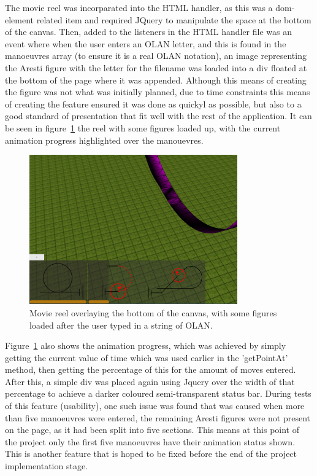 The movie reel was incorparated into the HTML handler, as this was a dom-element related item and required JQuery to manipulate the space at the bottom of the canvas. Then, added to the listeners in the HTML handler file was an event where when the user enters an OLAN letter, and this is found in the manoeuvres array (to ensure it is a real OLAN notation), an image representing the Aresti figure with the letter for the filename was loaded into a div floated at the bottom of the page where it was appended. Although this means of creating the figure was not what was initially planned, due to time constraints this means of creating the feature ensured it was done as quickyl as possible, but also to a good standard of presentation that fit well with the rest of the application. It can be seen in figure~\ref{fig:movie} the reel with some figures loaded up, with the current animation progress highlighted over the manouevres.

\clearpage 

\begin{figure}[h]
  \centering
      \includegraphics[width=0.8\textwidth]{images/movie.png}
  \caption{Movie reel overlaying the bottom of the canvas, with some figures loaded after the user typed in a string of OLAN.}
  \label{fig:movie}
\end{figure}

Figure~\ref{fig:movie} also shows the animation progress, which was achieved by simply getting the current value of time which was used earlier in the 'getPointAt' method, then getting the percentage of this for the amount of moves entered. After this, a simple div was placed again using Jquery over the width of that percentage to achieve a darker coloured semi-transparent status bar. During tests of this feature (usability), one such issue was found that was caused when more than five manoeuvres were entered, the remaining Aresti figures were not present on the page, as it had been split into five sections. This means at this point of the project only the first five manoeuvres have their animation status shown. This is another feature that is hoped to be fixed before the end of the project implementation stage. 

